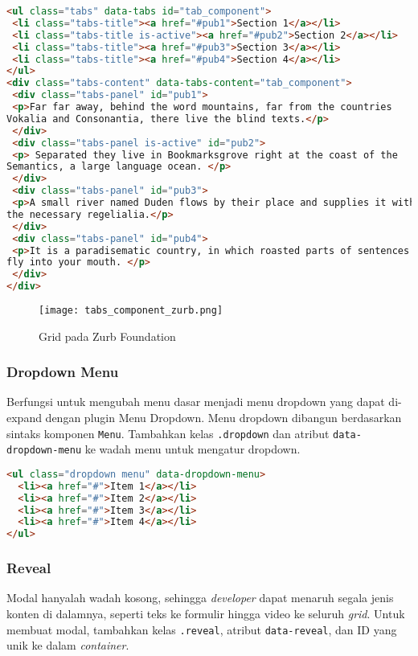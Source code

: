 \begin{itemize}
\begin{lstlisting}[language=HTML, frame=single, basicstyle=\small] 
<ul class="tabs" data-tabs id="tab_component">
 <li class="tabs-title"><a href="#pub1">Section 1</a></li>
 <li class="tabs-title is-active"><a href="#pub2">Section 2</a></li>
 <li class="tabs-title"><a href="#pub3">Section 3</a></li>
 <li class="tabs-title"><a href="#pub4">Section 4</a></li>
</ul>
<div class="tabs-content" data-tabs-content="tab_component">
 <div class="tabs-panel" id="pub1">
 <p>Far far away, behind the word mountains, far from the countries
Vokalia and Consonantia, there live the blind texts.</p>
 </div>
 <div class="tabs-panel is-active" id="pub2">
 <p> Separated they live in Bookmarksgrove right at the coast of the
Semantics, a large language ocean. </p>
 </div>
 <div class="tabs-panel" id="pub3">
 <p>A small river named Duden flows by their place and supplies it with
the necessary regelialia.</p>
 </div>
 <div class="tabs-panel" id="pub4">
 <p>It is a paradisematic country, in which roasted parts of sentences
fly into your mouth. </p>
 </div>
</div>
\end{lstlisting}

\begin{figure} [H]
	\centering  
	\texttt{[image: tabs\_component\_zurb.png]}  
	\caption{Grid pada Zurb Foundation}
\end{figure}

\subsubsection{Dropdown Menu}
Berfungsi untuk mengubah menu dasar menjadi menu dropdown yang dapat di-expand dengan plugin Menu Dropdown.
Menu dropdown dibangun berdasarkan sintaks komponen \texttt{Menu}. Tambahkan kelas \texttt{.dropdown} dan atribut \texttt{data-dropdown-menu} ke wadah menu untuk mengatur dropdown. 
\begin{lstlisting}[language=HTML, frame=single, basicstyle=\small] 
<ul class="dropdown menu" data-dropdown-menu>
  <li><a href="#">Item 1</a></li>
  <li><a href="#">Item 2</a></li>
  <li><a href="#">Item 3</a></li>
  <li><a href="#">Item 4</a></li>
</ul>
\end{lstlisting}

\subsubsection{Reveal}
Modal hanyalah wadah kosong, sehingga \textit{developer} dapat menaruh segala jenis konten di dalamnya, seperti teks ke formulir hingga video ke seluruh \textit{grid}.
Untuk membuat modal, tambahkan kelas \texttt{.reveal}, atribut \texttt{data-reveal}, dan ID yang unik ke dalam \textit{container}.


\end{itemize}
